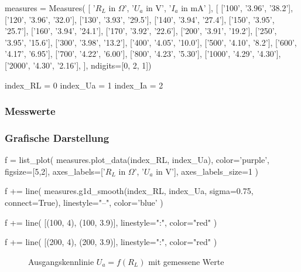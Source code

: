 \documentclass[a4paper]{hitec}
\begin{document}
\begin{sagesilent}
    measures = Measures(
        [
            '$R_L$ in $\Omega$',
            '$U_a$ in V', 
            '$I_a$ in mA'
        ], [
            ['100', '3.96', '38.2'],
            ['120', '3.96', '32.0'],
            ['130', '3.93', '29.5'],
            ['140', '3.94', '27.4'],
            ['150', '3.95', '25.7'],
            ['160', '3.94', '24.1'],
            ['170', '3.92', '22.6'],
            ['200', '3.91', '19.2'],
            ['250', '3.95', '15.6'],
            ['300', '3.98', '13.2'],
            ['400', '4.05', '10.0'],
            ['500', '4.10', '8.2'],
            ['600', '4.17', '6.95'],
            ['700', '4.22', '6.00'],
            ['800', '4.23', '5.30'],
            ['1000', '4.29', '4.30'],
            ['2000', '4.30', '2.16'],
        ], ndigits=[0, 2, 1])

    index_RL = 0
    index_Ua = 1
    index_Ia = 2
\end{sagesilent}

\subsubsection{Messwerte}

\begin{center}
    \renewcommand{\arraystretch}{1.2}
\end{center}

\subsubsection{Grafische Darstellung}

\begin{sagesilent}
    f = list_plot(
        measures.plot_data(index_RL, index_Ua),
        color='purple',
        figsize=[5,2],
        axes_labels=['$R_L$ in $\Omega$', '$U_a$ in V'],
        axes_labels_size=1
    )

    f += line(
        measures.g1d_smooth(index_RL, index_Ua, sigma=0.75, connect=True),
        linestyle="--",
        color='blue'
    )

    f += line(
        [(100, 4), (100, 3.9)],
        linestyle=":",
        color="red"
    )

    f += line(
        [(200, 4), (200, 3.9)],
        linestyle=":",
        color="red"
    )
\end{sagesilent}

\begin{figure}[H]
    \centering
    \caption{Ausgangskennlinie \textbf{$U_{a} = f(R_L)$} mit gemessene Werte}
    \label{fig:measure1}
\end{figure}
\end{document}
